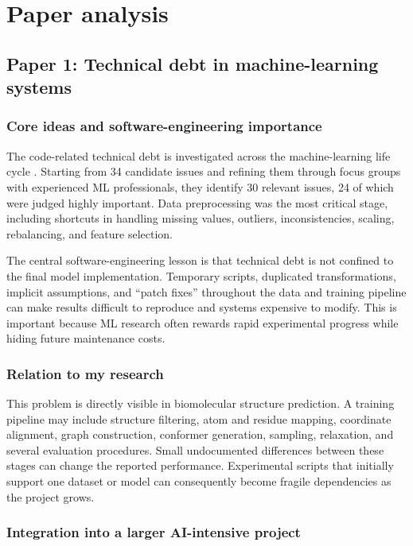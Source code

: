 \documentclass[a4paper,11pt]{article}
\begin{document}
\section{Paper analysis}

\subsection{Paper 1: Technical debt in machine-learning systems}

\subsubsection{Core ideas and software-engineering importance}

The code-related technical debt is investigated across the machine-learning life cycle \cite{ximenes2025technicaldebt}. Starting from 34 candidate issues and refining them through focus groups with experienced ML professionals, they identify 30 relevant issues, 24 of which were judged highly important. Data preprocessing was the most critical stage, including shortcuts in handling missing values, outliers, inconsistencies, scaling, rebalancing,
and feature selection.

The central software-engineering lesson is that technical debt is not confined to the final model implementation. Temporary scripts, duplicated transformations, implicit assumptions, and ``patch fixes'' throughout the data and training pipeline can make results difficult to reproduce and systems expensive to modify. This is important because ML research often rewards rapid experimental progress while hiding future maintenance costs.

\subsubsection{Relation to my research}

This problem is directly visible in biomolecular structure prediction. A training pipeline may include structure filtering, atom and residue mapping, coordinate alignment, graph construction, conformer generation, sampling, relaxation, and several evaluation procedures. Small undocumented differences between these stages can change the reported performance. Experimental scripts that initially support one dataset or model can consequently become fragile dependencies as the project grows.

\subsubsection{Integration into a larger AI-intensive project}
\end{document}

